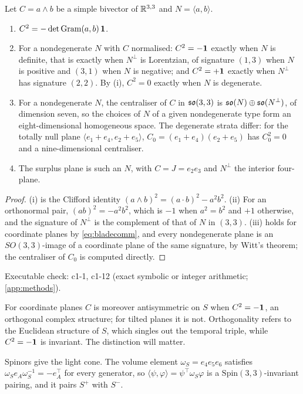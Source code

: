 \begin{theorem}
\label{thm:selector}
Let $C=a\wedge b$ be a simple bivector of $\mathbb{R}^{3,3}$ and $N=\langle a,b\rangle$.
\begin{enumerate}[label=(\roman*),leftmargin=2.2em]
\item $C^2=-\det\mathrm{Gram}(a,b)\,\mathbf 1$.
\item For a nondegenerate $N$ with $C$ normalised: $C^2=-\mathbf 1$ exactly when $N$ is definite, that is exactly when $N^\perp$ is Lorentzian, of signature $(1,3)$
when $N$ is positive and $(3,1)$ when $N$ is negative; and $C^2=+\mathbf 1$ exactly when $N^\perp$ has signature $(2,2)$. By (i), $C^2=0$ exactly when $N$ is degenerate.
\item For a nondegenerate $N$, the centraliser of $C$ in $\mathfrak{so}(3,3)$ is $\mathfrak{so}(N)\oplus\mathfrak{so}(N^\perp)$, of dimension seven, so the choices of $N$ of a given
nondegenerate type form an eight-dimensional homogeneous space. The degenerate strata differ: for the totally null plane $\langle e_1+e_4,e_2+e_5\rangle$,
$C_0=(e_1+e_4)(e_2+e_5)$ has $C_0^2=0$ and a nine-dimensional centraliser.
\item The surplus plane is such an $N$, with $C=J=e_2e_3$ and $N^\perp$ the interior four-plane.
\end{enumerate}
\end{theorem}

\begin{proof}
(i) is the Clifford identity $(a\wedge b)^2=(a\cdot b)^2-a^2b^2$. (ii) For an orthonormal pair, $(ab)^2=-a^2b^2$, which is $-1$ when $a^2=b^2$ and $+1$ otherwise, and the
signature of $N^\perp$ is the complement of that of $N$ in $(3,3)$. (iii) holds for coordinate planes by \eqref{eq:bladecomm}, and every nondegenerate plane is an
$SO(3,3)$-image of a coordinate plane of the same signature, by Witt's theorem; the centraliser of $C_0$ is computed directly.
\end{proof}

\noindent Executable check: c1-1, c1-12 (exact symbolic or integer arithmetic; \cref{app:methods}).

For coordinate planes $C$ is moreover antisymmetric on $S$ when $C^2=-\mathbf 1$, an orthogonal complex structure; for tilted planes it is not. Orthogonality refers to the
Euclidean structure of $S$, which singles out the temporal triple, while $C^2=-\mathbf 1$ is invariant. The distinction will matter.

Spinors give the light cone. The volume element $\omega_S=e_4e_5e_6$ satisfies $\omega_Se_A\omega_S^{-1}=-e_A^{\!\top}$ for every generator, so
$\langle\psi,\varphi\rangle=\psi^{\!\top}\omega_S\varphi$ is a $\mathrm{Spin}(3,3)$-invariant pairing, and it pairs $S^+$ with $S^-$.

